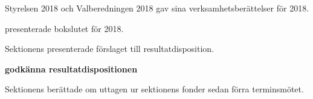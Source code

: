 \documentclass[10pt]{article}
\begin{document}
\begin{paragrafer}
Styrelsen 2018 och Valberedningen 2018 gav sina verksamhetsberättelser för 2018.

    presenterade bokslutet för 2018.



Sektionens \fvc presenterade förslaget till resultatdisposition.

\textbf{\Mba godkänna resultatdispositionen}

Sektionens \fvc berättade om uttagen ur sektionens fonder sedan förra terminsmötet.


\end{paragrafer}
\end{document}
